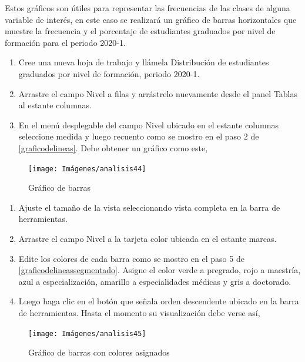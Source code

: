 \documentclass[
]{book}
\begin{document}
Estos gráficos son útiles para representar las frecuencias de las clases de alguna variable de interés, en este caso se realizará un gráfico de barras horizontales que muestre la frecuencia y el porcentaje de estudiantes graduados por nivel de formación para el periodo 2020-1.

\begin{enumerate}
\def\labelenumi{\arabic{enumi}.}
\item
  Cree una nueva hoja de trabajo y llámela Distribución de estudiantes graduados por nivel de formación, periodo 2020-1.
\item
  Arrastre el campo Nivel a filas y arrástrelo nuevamente desde el panel Tablas al estante columnas.
\item
  En el menú desplegable del campo Nivel ubicado en el estante columnas seleccione medida y luego recuento como se mostro en el paso 2 de \ref{graficodelineas}. Debe obtener un gráfico como este,
\end{enumerate}

\begin{figure}

{\centering \texttt{[image: Imágenes/analisis44]} 

}

\caption{Gráfico de barras}\label{fig:paso3graficobarras-fig}
\end{figure}

\begin{enumerate}
\def\labelenumi{\arabic{enumi}.}
\setcounter{enumi}{3}
\item
  Ajuste el tamaño de la vista seleccionando vista completa en la barra de herramientas.
\item
  Arrastre el campo Nivel a la tarjeta color ubicada en el estante marcas.
\item
  Edite los colores de cada barra como se mostro en el paso 5 de \ref{graficodelineassegmentado}. Asigne el color verde a pregrado, rojo a maestría, azul a especialización, amarillo a especialidades médicas y gris a doctorado.
\item
  Luego haga clic en el botón que señala orden descendente ubicado en la barra de herramientas. Hasta el momento su visualización debe verse así,
\end{enumerate}

\begin{figure}

{\centering \texttt{[image: Imágenes/analisis45]} 

}

\caption{Gráfico de barras con colores asignados}\label{fig:paso7graficobarras-fig}
\end{figure}
\end{document}
